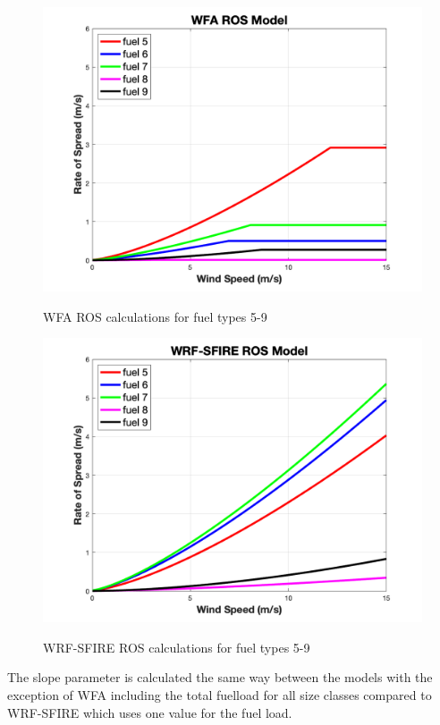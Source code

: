 \documentclass{article}
\begin{document}
\begin{figure}[!h]
\begin{minipage}{0.47\linewidth}
\label{WFA_ROS_2}
\includegraphics[width=\linewidth]{images/image_1.png}
\caption{WFA ROS calculations for fuel types 5-9}
\end{minipage}
\hfill
\begin{minipage}[c]{0.47\linewidth}
\label{WRF_ROS_2}
\includegraphics[width=\linewidth]{images/image_2.png}
\caption{WRF-SFIRE ROS calculations for fuel types 5-9}
\end{minipage}
\end{figure}
 

The slope parameter is calculated the same way between the models with the exception of WFA including the total fuelload for all size classes compared to WRF-SFIRE which uses one value for the fuel load. 
\end{document}
